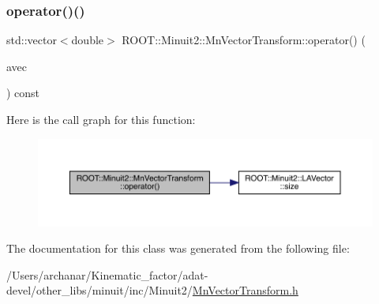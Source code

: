 \subsubsection{\texorpdfstring{operator()()}{operator()()}\hspace{0.1cm}{\footnotesize\ttfamily [3/3]}}
{\footnotesize\ttfamily std\+::vector$<$double$>$ R\+O\+O\+T\+::\+Minuit2\+::\+Mn\+Vector\+Transform\+::operator() (\begin{DoxyParamCaption}\item[{const \mbox{\hyperlink{namespaceROOT_1_1Minuit2_a62ed97730a1ca8d3fbaec64a19aa11c9}{Mn\+Algebraic\+Vector}} \&}]{avec }\end{DoxyParamCaption}) const\hspace{0.3cm}{\ttfamily [inline]}}

Here is the call graph for this function\+:
\nopagebreak
\begin{figure}[H]
\begin{center}
\leavevmode
\includegraphics[width=350pt]{d1/d58/classROOT_1_1Minuit2_1_1MnVectorTransform_a2b16b519635ee775a78d3f62663bef89_cgraph}
\end{center}
\end{figure}


The documentation for this class was generated from the following file\+:\begin{DoxyCompactItemize}
\item 
/\+Users/archanar/\+Kinematic\+\_\+factor/adat-\/devel/other\+\_\+libs/minuit/inc/\+Minuit2/\mbox{\hyperlink{adat-devel_2other__libs_2minuit_2inc_2Minuit2_2MnVectorTransform_8h}{Mn\+Vector\+Transform.\+h}}\end{DoxyCompactItemize}
